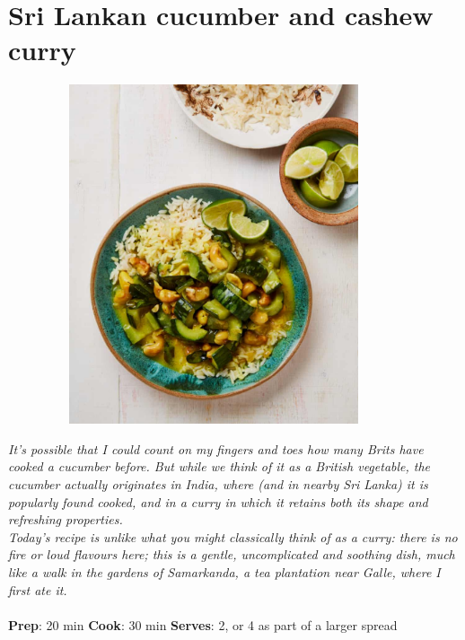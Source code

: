 \documentclass{book}
\begin{document}
\section{Sri Lankan cucumber and cashew curry}
\begin{figure}
\centering\includegraphics[width=10cm,height=10cm,keepaspectratio]{Recipe_Pictures/Sri_Lankan_cucumber_and_cashew_curry.png}
\end{figure}
\emph{It’s possible that I could count on my fingers and toes how many Brits have cooked a cucumber before. But while we think of it as a British vegetable, the cucumber actually originates in India, where (and in nearby Sri Lanka) it is popularly found cooked, and in a curry in which it retains both its shape and refreshing properties.\\ 
Today’s recipe is unlike what you might classically think of as a curry: there is no fire or loud flavours here; this is a gentle, uncomplicated and soothing dish, much like a walk in the gardens of Samarkanda, a tea plantation near Galle, where I first ate it.}\\\\ 
\textbf{Prep}: 20 min
\textbf{Cook}: 30 min
\textbf{Serves}: 2, or 4 as part of a larger spread
\end{document}
